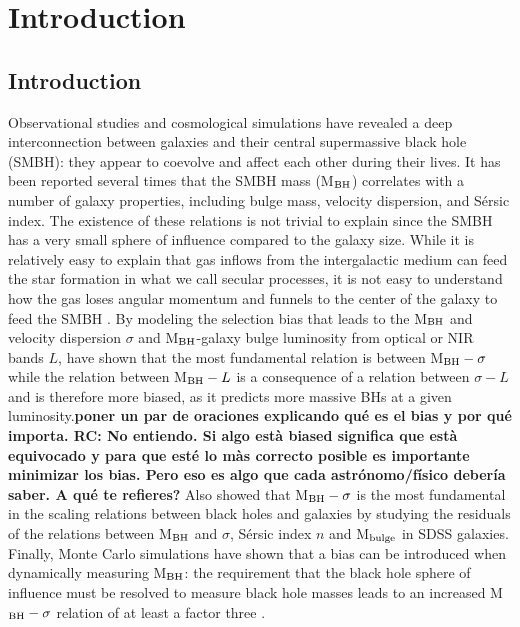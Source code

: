 \chapter{Introduction}



\section{Introduction}
Observational studies and cosmological simulations have revealed a deep interconnection between galaxies and their central supermassive black hole (SMBH): they appear to coevolve and affect each other during their lives.
It has been reported several times that the SMBH mass (M$_{\rm BH}$) correlates with a number of galaxy properties, including bulge mass, velocity dispersion, and S\'{e}rsic index. The existence of these relations is not trivial to explain since the SMBH has a very small sphere of influence compared to the galaxy size. While it is relatively easy to explain that gas inflows from the intergalactic medium can feed the star formation in what we call secular processes, it is not easy to understand how the gas loses angular momentum and funnels to the center of the galaxy to feed the SMBH \citep{2019NatAs...3...48S}. %
By modeling the selection bias that leads to the M$_{\rm BH}$ and velocity dispersion $\sigma$ and M$_{\rm BH}$-galaxy bulge luminosity from optical or NIR bands $L$, \citet{2007ApJ...660..267B} have shown that the most fundamental relation is between M$_{\rm BH}-\sigma$ while the relation between M$_{\rm BH}- L$ is a consequence of a relation between $\sigma-L$ and is therefore more biased, as it predicts more massive BHs at a given luminosity.{\bf poner un par de oraciones explicando qué es el bias y por qué importa. RC: No entiendo. Si algo està biased significa que està equivocado y para que esté lo màs correcto posible es importante minimizar los bias. Pero eso es algo que cada astrónomo/físico debería saber. A qué te refieres?} Also \citet{2017MNRAS.466.4029S} showed that M$_{\rm BH}-\sigma$ is the most fundamental in the scaling relations between black holes and galaxies by studying the residuals of the relations between M$_{\rm BH}$ and $\sigma$, S\'{e}rsic index $n$ and M$_{\rm bulge}$ in SDSS galaxies. Finally, Monte Carlo simulations have shown that a bias can be introduced when dynamically measuring M$_{\rm BH}$: the requirement that the black hole sphere of influence must be resolved to measure black hole masses leads to an increased M$_{\rm BH}-\sigma$ relation of at least a factor three \citep{2016MNRAS.460.3119S}.
